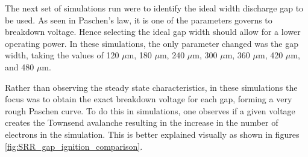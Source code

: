 The next set of simulations run were to identify the ideal width discharge gap to be used. As seen in Paschen's law, it is one of the parameters governs to breakdown voltage. Hence selecting the ideal gap width should allow for a lower operating power. In these simulations, the only parameter changed was the gap width, taking the values of 120 $\mu$m, 180 $\mu$m, 240 $\mu$m, 300 $\mu$m, 360 $\mu$m, 420 $\mu$m, and 480 $\mu$m. 

Rather than observing the steady state characteristics, in these simulations the focus was to obtain the exact breakdown voltage for each gap, forming a very rough Paschen curve. To do this in simulations, one observes if a given voltage creates the Townsend avalanche resulting in the increase in the number of electrons in the simulation. This is better explained visually as shown in figures \ref{fig:SRR_gap_ignition_comparison}. 

